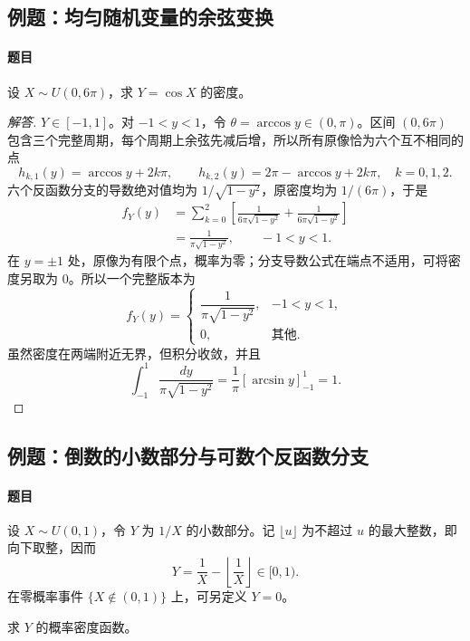 \subsection{例题：均匀随机变量的余弦变换}\label{note:c2:e24}
\paragraph{题目}
设 $X\sim U(0,6\pi)$，求 $Y=\cos X$ 的密度。

\begin{proof}[解答]
$Y\in[-1,1]$。对 $-1<y<1$，令 $\theta=\arccos y\in(0,\pi)$。区间 $(0,6\pi)$ 包含三个完整周期，每个周期上余弦先减后增，所以所有原像恰为六个互不相同的点
\[
h_{k,1}(y)=\arccos y+2k\pi,\qquad
h_{k,2}(y)=2\pi-\arccos y+2k\pi,
\quad k=0,1,2.
\]
六个反函数分支的导数绝对值均为 $1/\sqrt{1-y^2}$，原密度均为 $1/(6\pi)$，于是
\begin{align*}
f_Y(y)
&=\sum_{k=0}^2
\left[
\frac1{6\pi\sqrt{1-y^2}}+
\frac1{6\pi\sqrt{1-y^2}}
\right]\\
&=\frac1{\pi\sqrt{1-y^2}},\qquad -1<y<1.
\end{align*}
在 $y=\pm1$ 处，原像为有限个点，概率为零；分支导数公式在端点不适用，可将密度另取为 $0$。所以一个完整版本为
\[
f_Y(y)=
\begin{cases}
\dfrac1{\pi\sqrt{1-y^2}},&-1<y<1,\\
0,&\text{其他}.
\end{cases}
\]
虽然密度在两端附近无界，但积分收敛，并且
\[
\int_{-1}^1\frac{dy}{\pi\sqrt{1-y^2}}
=\frac1\pi\left[\arcsin y\right]_{-1}^1=1.
\]
\end{proof}

\subsection{例题：倒数的小数部分与可数个反函数分支}\label{note:c2:e25}
\paragraph{题目}
设 $X\sim U(0,1)$，令 $Y$ 为 $1/X$ 的小数部分。记 $\lfloor u\rfloor$ 为不超过 $u$ 的最大整数，即向下取整，因而
\[
Y=\frac1X-\left\lfloor\frac1X\right\rfloor\in[0,1).
\]
在零概率事件 $\{X\notin(0,1)\}$ 上，可另定义 $Y=0$。

求 $Y$ 的概率密度函数。

